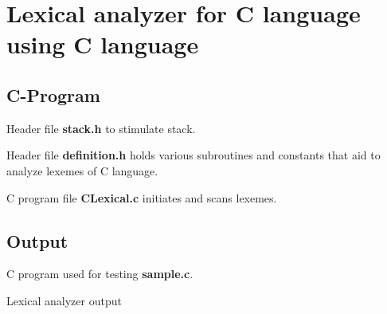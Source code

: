\section{Lexical analyzer for C language using C language}
\subsection{C-Program}
Header file \textbf{stack.h} to stimulate stack.


\vspace{0.5cm}
Header file \textbf{definition.h} holds various subroutines and constants that aid to analyze lexemes of C language.


\vspace{0.5cm}
C program file \textbf{CLexical.c} initiates and scans lexemes.



\subsection{Output}
C program used for testing \textbf{sample.c}.


\vspace{0.5cm}
Lexical analyzer output
